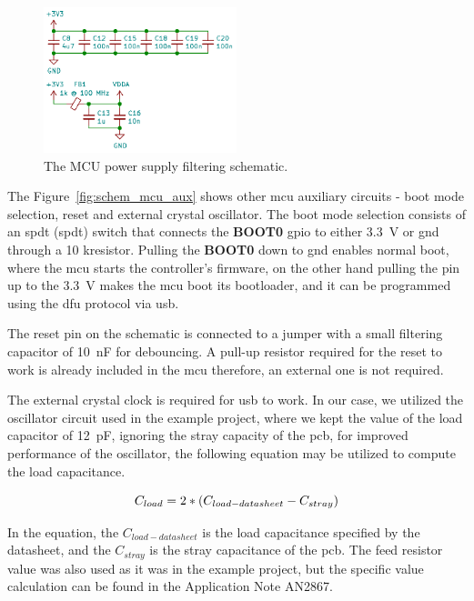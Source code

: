 \begin{figure}[H]
    \centering
    \includegraphics[width=0.5\textwidth]{obrazky/schem_mcu_power_filter}
    \caption{The MCU power supply filtering schematic.}
    \label{fig:schem_mcu_power}
\end{figure}

The Figure~\ref{fig:schem_mcu_aux} shows other \acs{mcu} auxiliary circuits - boot mode selection, reset and external crystal oscillator.
The boot mode selection consists of an \acs{spdt} (\acl{spdt}) switch that connects the \textbf{BOOT0} \acs{gpio} to either 3.3~V or \acs{gnd} through a 10 k\textohm resistor.
Pulling the \textbf{BOOT0} down to \acs{gnd} enables normal boot, where the \acs{mcu} starts the controller's firmware, on the other hand pulling the pin up to the 3.3~V makes the \acs{mcu} boot its bootloader, and it can be programmed using the \acs{dfu} protocol via \acs{usb}.

The reset pin on the schematic is connected to a jumper with a small filtering capacitor of 10~nF for debouncing.
A pull-up resistor required for the reset to work is already included in the \acs{mcu} therefore, an external one is not required.

The external crystal clock is required for \acs{usb} to work.
In our case, we utilized the oscillator circuit used in the example project, where we kept the value of the load capacitor of 12~pF, ignoring the stray capacity of the \acs{pcb}, for improved performance of the oscillator, the following equation may be utilized to compute the load capacitance.

\begin{equation}
    \centering
    C_{load} = 2 * (C_{load-{datasheet}} - C_{stray})
    \label{eq:clock_cap}
\end{equation}

In the equation, the $C_{load-{datasheet}}$ is the load capacitance specified by the datasheet, and the $C_{stray}$ is the stray capacitance of the \acs{pcb}.
The feed resistor value was also used as it was in the example project, but the specific value calculation can be found in the Application Note AN2867\cite{stmicro_an2867_2020}.

